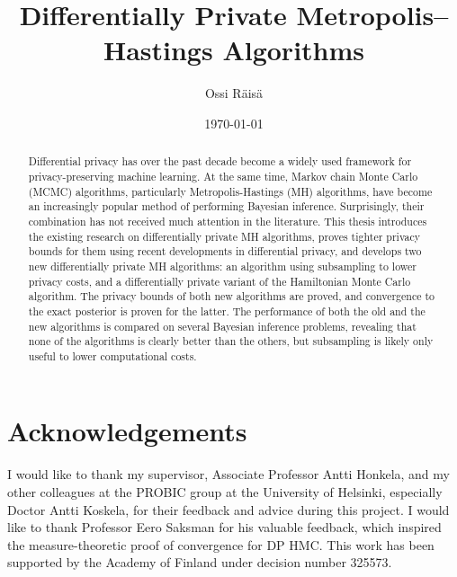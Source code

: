 \documentclass[english,twoside,openright]{HYgraduMLDS}
\title{Differentially Private Metropolis--Hastings Algorithms}
\author{Ossi Räisä}
\date{\today}
\begin{document}
\maketitle


\begin{abstract}
  Differential privacy has over the past decade become a widely used framework
  for privacy-preserving machine learning. At the same time,
  Markov chain Monte Carlo (MCMC) algorithms, particularly Metropolis-Hastings (MH)
  algorithms, have become an increasingly popular method
  of performing Bayesian inference. Surprisingly, their combination has not
  received much attention in the literature. This thesis introduces the
  existing research on differentially private MH algorithms, proves tighter
  privacy bounds for them using recent developments in differential privacy, and
  develops two new differentially private MH algorithms:
  an algorithm using subsampling to lower privacy costs, and
  a differentially private variant of the Hamiltonian Monte
  Carlo algorithm. The privacy bounds of both new algorithms are proved, and
  convergence to the exact posterior is proven for the latter.
  The performance of both the old and the new algorithms is compared on several
  Bayesian inference problems, revealing that none of the algorithms is
  clearly better than the others, but subsampling is likely only useful to lower
  computational costs.
\end{abstract}

\section*{Acknowledgements}
I would like to thank my supervisor, Associate Professor Antti Honkela, and my
other colleagues at the PROBIC group at the University of Helsinki,
especially Doctor Antti Koskela, for their feedback and advice during this
project. I would like to thank Professor Eero Saksman for his valuable feedback,
which inspired the measure-theoretic proof of convergence for DP HMC.
This work has been supported by the Academy of Finland under decision number
325573.

\mytableofcontents
\end{document}
